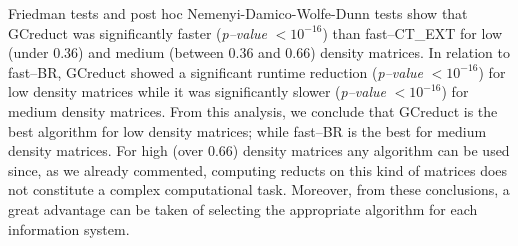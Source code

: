 \documentclass[number,preprint,review,12pt]{elsarticle}
\begin{document}
	Friedman tests and post hoc Nemenyi-Damico-Wolfe-Dunn tests show that GCreduct was significantly faster (\textit{p--value} $< 10^{-16}$) than fast--CT\_EXT for low (under 0.36) and medium (between 0.36 and 0.66) density matrices. In relation to fast--BR, GCreduct showed a significant runtime reduction (\textit{p--value} $< 10^{-16}$) for low density matrices while it was significantly slower (\textit{p--value} $< 10^{-16}$) for medium density matrices. From this analysis, we conclude that GCreduct is the best algorithm for low density matrices; while fast--BR is the best for medium density matrices. For high (over 0.66) density matrices any algorithm can be used since, as we already commented, computing reducts on this kind of matrices does not constitute a complex computational task. Moreover, from these conclusions, a great advantage can be taken of selecting the appropriate algorithm for each information system. 
		
\end{document}

